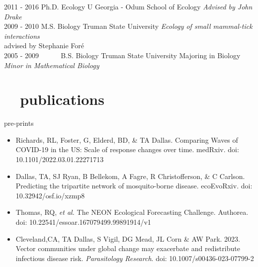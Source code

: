 \documentclass[]{CV}
\begin{document}
\begin{entrylist}
  \entry
    {2011 - 2016}
    {\normalfont Ph.D. Ecology}
    {U Georgia - Odum School of Ecology}
    {\emph{Advised by John Drake}}\\

  \entry
    {2009 - 2010}
    {M.S. Biology}
    {Truman State University}
    {\emph{Ecology of small mammal-tick interactions} \\ advised by Stephanie For\'e}\\

 \entry
    {2005 - 2009 \ \ \ \ \ }
    {B.S. Biology}
    {Truman State University}
    {Majoring in Biology\\
    \emph{Minor in Mathematical Biology}}\\
\end{entrylist}













\section{\faBook \ \  publications}


{\yearfont pre-prints} 

\begin{itemize}

\item Richards, RL, Foster, G, Elderd, BD, \& {\mefont TA Dallas}. Comparing Waves of COVID-19 in the US: Scale of response changes over time. medRxiv. doi: 10.1101/2022.03.01.22271713 

\item {\mefont Dallas, TA}, SJ Ryan, B Bellekom, A Fagre,  R Christofferson, \& C Carlson. Predicting the tripartite network of mosquito-borne disease. ecoEvoRxiv. doi: 10.32942/osf.io/xzmp8

\item Thomas, RQ, \textit{et al.} The NEON Ecological Forecasting Challenge. Authorea. doi: 10.22541/essoar.167079499.99891914/v1
\end{itemize}



{}

\begin{itemize}

\item Cleveland,CA, {\mefont TA Dallas}, S Vigil, DG Mead, JL Corn \& AW Park. 2023. Vector communities under global change may exacerbate and redistribute infectious disease risk. \textit{Parasitology Research}. doi: 10.1007/s00436-023-07799-2
  


\end{itemize}
\end{document}
